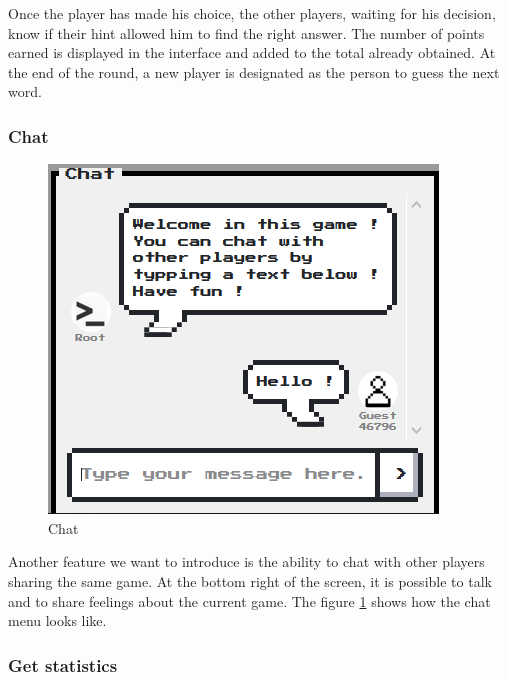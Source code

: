 \documentclass{tnreport}
\begin{document}
Once the player has made his choice, the other players, waiting for his decision, know if their hint allowed him to find the right answer. The number of points earned is displayed in the interface and added to the total already obtained. At the end of the round, a new player is designated as the person to guess the next word.

\bigskip

\subsubsection{Chat}

\begin{figure}
	\centering
	\vspace*{-2cm}
	\includegraphics[scale=0.63]{figures/chat}
	\caption{Chat}
	\label{fig:chat}
	\vspace*{-2cm}
\end{figure}

Another feature we want to introduce is the ability to chat with other players sharing the same game. At the bottom right of the screen, it is possible to talk and to share feelings about the current game. The figure \ref{fig:chat} shows how the chat menu looks like.

\clearpage

\subsubsection{Get statistics}
\end{document}
